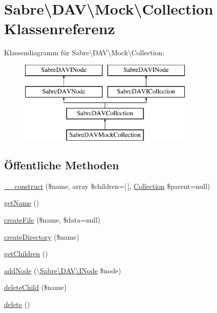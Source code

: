 \hypertarget{class_sabre_1_1_d_a_v_1_1_mock_1_1_collection}{}\section{Sabre\textbackslash{}D\+AV\textbackslash{}Mock\textbackslash{}Collection Klassenreferenz}
\label{class_sabre_1_1_d_a_v_1_1_mock_1_1_collection}
Klassendiagramm für Sabre\textbackslash{}D\+AV\textbackslash{}Mock\textbackslash{}Collection\+:\begin{figure}[H]
\begin{center}
\leavevmode
\includegraphics[height=4.000000cm]{class_sabre_1_1_d_a_v_1_1_mock_1_1_collection}
\end{center}
\end{figure}
\subsection*{Öffentliche Methoden}
\begin{DoxyCompactItemize}
\item 
\mbox{\hyperlink{class_sabre_1_1_d_a_v_1_1_mock_1_1_collection_a1d2431f6f2645453c6bb3099fe643d7e}{\+\_\+\+\_\+construct}} (\$name, array \$children=\mbox{[}$\,$\mbox{]}, \mbox{\hyperlink{class_sabre_1_1_d_a_v_1_1_collection}{Collection}} \$parent=null)
\item 
\mbox{\hyperlink{class_sabre_1_1_d_a_v_1_1_mock_1_1_collection_ac7ad2f771a34a1099214f0e4e19897f9}{get\+Name}} ()
\item 
\mbox{\hyperlink{class_sabre_1_1_d_a_v_1_1_mock_1_1_collection_a7d30a56a4eca887ee8ba5f6d819dc5dd}{create\+File}} (\$name, \$data=null)
\item 
\mbox{\hyperlink{class_sabre_1_1_d_a_v_1_1_mock_1_1_collection_a48e2f0896c892cdc0c3c6fe87b9da153}{create\+Directory}} (\$name)
\item 
\mbox{\hyperlink{class_sabre_1_1_d_a_v_1_1_mock_1_1_collection_a3814f1e53b147e13ebdddc6324639a80}{get\+Children}} ()
\item 
\mbox{\hyperlink{class_sabre_1_1_d_a_v_1_1_mock_1_1_collection_a34bd7edc09df3fc2f76dcbda0dc4863e}{add\+Node}} (\textbackslash{}\mbox{\hyperlink{interface_sabre_1_1_d_a_v_1_1_i_node}{Sabre\textbackslash{}\+D\+A\+V\textbackslash{}\+I\+Node}} \$node)
\item 
\mbox{\hyperlink{class_sabre_1_1_d_a_v_1_1_mock_1_1_collection_abbb3c34e222824152a26a0e75718a164}{delete\+Child}} (\$name)
\item 
\mbox{\hyperlink{class_sabre_1_1_d_a_v_1_1_mock_1_1_collection_a7ac084bfb4f1ff2fd0c2f93155e2a5c6}{delete}} ()
\end{DoxyCompactItemize}
